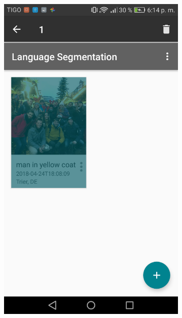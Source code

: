 \begin{figure}[!htbp]
\begin{multicols}{3}
\begin{subfigure}[b]{\columnwidth}
    \label{subfig:additional_menu}
    \end{subfigure}
    
    \begin{subfigure}[b]{\columnwidth}
            \centering
            \includegraphics[width=\textwidth]{./figures/dmn_app/views/16.png}
    \label{subfig:selection_overlay}
    \end{subfigure}
    

\end{multicols}
\end{figure}
